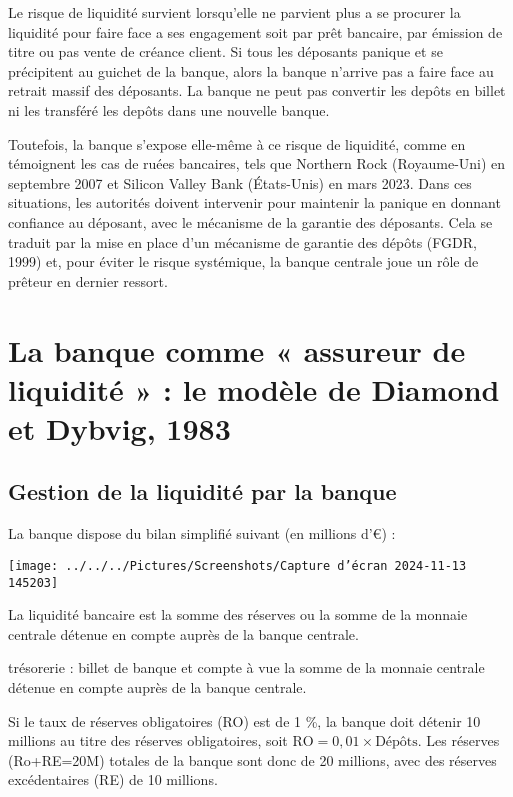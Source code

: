 \documentclass[a4paper, 12pt]{report}
\begin{document}
Le risque de liquidité survient lorsqu'elle ne parvient plus a se procurer la liquidité pour faire face a ses engagement soit par prêt bancaire, par émission de titre ou pas vente de créance client. Si tous les déposants panique et se précipitent au guichet de la banque, alors la banque n'arrive pas a faire face au retrait massif des déposants. La banque ne peut pas convertir les depôts en billet ni les transféré les depôts dans une nouvelle banque.

Toutefois, la banque s'expose elle-même à ce risque de liquidité, comme en témoignent les cas de ruées bancaires, tels que Northern Rock (Royaume-Uni) en septembre 2007 et Silicon Valley Bank (États-Unis) en mars 2023. Dans ces situations, les autorités doivent intervenir pour maintenir la panique en donnant confiance au déposant, avec le mécanisme de la garantie des déposants. Cela se traduit par la mise en place d'un mécanisme de garantie des dépôts (FGDR, 1999) et, pour éviter le risque systémique, la banque centrale joue un rôle de prêteur en dernier ressort. 

\section{La banque comme « assureur de liquidité » : le modèle de Diamond et Dybvig, 1983}

\subsection{Gestion de la liquidité par la banque}
La banque dispose du bilan simplifié suivant (en millions d’€) :

\begin{center}
	\texttt{[image: ../../../Pictures/Screenshots/Capture d'écran 2024-11-13 145203]}
\end{center}

La liquidité bancaire est la somme des réserves ou la somme de la monnaie centrale détenue en compte auprès de la banque centrale. 

trésorerie : billet de banque et compte à vue la somme de la monnaie centrale détenue en compte auprès de la banque centrale. 

Si le taux de réserves obligatoires (RO) est de 1 \%, la banque doit détenir 10 millions au titre des réserves obligatoires, soit \( \text{RO} = 0,01 \times \text{Dépôts} \). Les réserves (Ro+RE=20M) totales de la banque sont donc de 20 millions, avec des réserves excédentaires (RE) de 10 millions.
\end{document}
